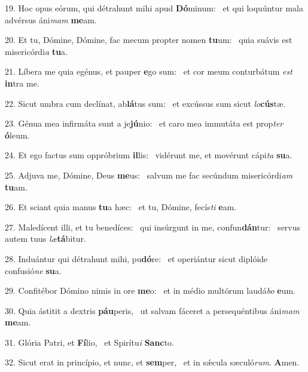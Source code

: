19. Hoc opus eórum, qui détrahunt mihi apud \textbf{Dó}minum: \ast\  et qui loquúntur mala advérsus áni\textit{mam} \textbf{me}am.\

20. Et tu, Dómine, Dómine, fac mecum propter nomen \textbf{tu}um: \ast\  quia suávis est misericórdi\textit{a} \textbf{tu}a.\

21. Líbera me quia egénus, et pauper \textbf{e}go sum: \ast\  et cor meum conturbátum \textit{est} \textbf{in}tra me.\

22. Sicut umbra cum declínat, ab\textbf{lá}tus sum: \ast\  et excússus sum sicut \textit{lo}\textbf{cús}tæ.\

23. Génua mea infirmáta sunt a je\textbf{jú}nio: \ast\  et caro mea immutáta est prop\textit{ter} \textbf{ó}leum.\

24. Et ego factus sum oppróbrium \textbf{il}lis: \ast\  vidérunt me, et movérunt cápi\textit{ta} \textbf{su}a.\

25. Adjuva me, Dómine, Deus \textbf{me}us: \ast\  salvum me fac secúndum misericórdi\textit{am} \textbf{tu}am.\

26. Et sciant quia manus \textbf{tu}a hæc: \ast\  et tu, Dómine, fecís\textit{ti} \textbf{e}am.\

27. Maledícent illi, et tu benedíces: \dag\  qui insúrgunt in me, confun\textbf{dán}tur: \ast\  servus autem tuus \textit{læ}\textbf{tá}bitur.\

28. Induántur qui détrahunt mihi, pu\textbf{dó}re: \ast\  et operiántur sicut diplóide confusió\textit{ne} \textbf{su}a.\

29. Confitébor Dómino nimis in ore \textbf{me}o: \ast\  et in médio multórum laudá\textit{bo} \textbf{e}um.\

30. Quia ástitit a dextris \textbf{páu}peris, \ast\  ut salvam fáceret a persequéntibus áni\textit{mam} \textbf{me}am.\

31. Glória Patri, et \textbf{Fí}lio, \ast\  et Spirítu\textit{i} \textbf{Sanc}to.\

32. Sicut erat in princípio, et nunc, et \textbf{sem}per, \ast\  et in sǽcula sæculó\textit{rum}. \textbf{A}men.\

